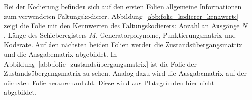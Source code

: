 Bei der Kodierung befinden sich auf den ersten Folien allgemeine Informationen zum verwendeten Faltungskodierer. Abbildung~\ref{abb:folie_kodierer_kennwerte} zeigt die Folie mit den Kennwerten des Faltungskodierers: Anzahl an Ausgänge $N$, Länge des Schieberegisters $M$, Generatorpolynome, Punktierungsmatrix und Koderate. Auf den nächsten beiden Folien werden die Zustandsübergangsmatrix und die Ausgabematrix abgebildet. In Abbildung~\ref{abb:folie_zustandsübergangsmatrix} ist die Folie der Zustandsübergangsmatrix zu sehen. Analog dazu wird die Ausgabematrix auf der nächsten Folie veranschaulicht. Diese wird aus Platzgründen hier nicht abgebildet.
\\
\\
\begin{figure}[t]
	\centering
	\begin{subfigure}{0.48\textwidth}
		\centering
		\caption{}
		\label{abb:folie_kodierung_1}
	\end{subfigure}
	\quad %
	\begin{subfigure}{0.48\textwidth}
		\centering
		\caption{}
		\label{abb:folie_kodierung_2}
	\end{subfigure}
	

\end{figure}
